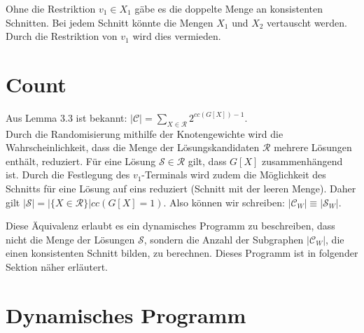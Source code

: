 Ohne die Restriktion $v_1 \in X_1$ gäbe es die doppelte Menge an konsistenten Schnitten. Bei jedem Schnitt könnte die Mengen $X_1$ und $X_2$ vertauscht werden. Durch die Restriktion von $v_1$ wird dies vermieden.


\section{Count}
\label{sec:st_count}
Aus Lemma 3.3 ist bekannt: $|\mathcal{C}|=\sum_{X \in \mathcal{R}} 2^{cc(G[X])-1}$. \\
Durch die Randomisierung mithilfe der Knotengewichte wird die Wahrscheinlichkeit, dass die Menge der Lösungskandidaten $\mathcal{R}$ mehrere Lösungen enthält, reduziert. 
Für eine Lösung $\mathcal{S} \in \mathcal{R}$ gilt, dass $G[X]$ zusammenhängend ist. 
Durch die Festlegung des $v_1$-Terminals wird zudem die Möglichkeit des Schnitts für eine Lösung auf eins reduziert (Schnitt mit der leeren Menge). 
Daher gilt $|\mathcal{S}| = |\{X \in \mathcal{R}\}| cc(G[X]=1)$.
Also können wir schreiben: $|\mathcal{C}_W| \equiv |\mathcal{S}_W|$.

Diese Äquivalenz erlaubt es ein dynamisches Programm zu beschreiben, dass nicht die Menge der Lösungen $\mathcal{S}$, sondern die Anzahl der Subgraphen $|\mathcal{C}_W|$, die einen konsistenten Schnitt bilden, zu berechnen. Dieses Programm ist in folgender Sektion näher erläutert.

\section{Dynamisches Programm}
\label{sec:dynP}


